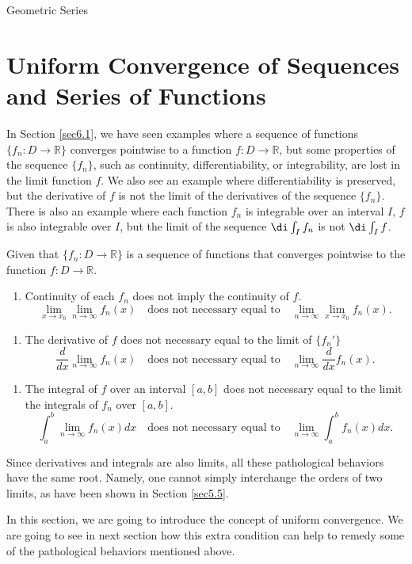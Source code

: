 \begin{example}[label=230305_16]{Geometric Series}
\vp

\section{Uniform Convergence of Sequences and Series of Functions}\label{sec6.2}
In Section \ref{sec6.1}, we have seen  examples where a sequence of functions $\{f_n:D\to\mathbb{R}\}$ converges pointwise to a function $f:D\to\mathbb{R}$, but some properties of the sequence $\{f_n\}$, such as continuity, differentiability, or integrability, are lost in the limit function $f$. We also see an example where differentiability is preserved, but the derivative of $f$ is not the limit of the derivatives of the sequence $\{f_n\}$. There is  also an example where each function $f_n$ is integrable over an interval $I$, $f$ is also integrable over $I$, but the limit of the sequence $\di\int_If_n$ is not $\di\int_If$. 

\begin{highlight}{}
Given that $\{f_n:D\to\mathbb{R}\}$ is a sequence of functions  that converges pointwise to the function $f:D\to\mathbb{R}$.
\begin{enumerate}[1.]
\item  Continuity of each $f_n$ does not imply the continuity of $f$.
\[\lim_{x\to x_0}\lim_{n\to\infty}f_n(x) \quad\text{does not necessary equal to}\quad 
\lim_{n\to\infty}\lim_{x\to x_0}f_n(x).\]\end{enumerate} 
\begin{enumerate}[2.]
\item The derivative of $f$ does not necessary equal to the limit of $\{f_n'\}$
\[\frac{d}{dx}\lim_{n\to\infty}f_n(x) \quad\text{does not necessary equal to}\quad \lim_{n\to\infty}\frac{d}{dx} f_n(x).\] \end{enumerate}\begin{enumerate}[3.]
\item  The integral of $f$ over an interval $[a,b]$ does not necessary equal to the limit the  integrals of $f_n$ over $[a,b]$.
\[\int_a^b\lim_{n\to\infty}f_n(x)dx\quad\text{does not necessary equal to}\quad\lim_{n\to\infty}\int_a^b f_n(x) dx .\]
\end{enumerate}
Since derivatives and integrals are also limits, all these pathological behaviors have the same root. Namely, one cannot simply interchange the orders of two limits, as have been shown in Section \ref{sec5.5}. 
\end{highlight}

In this section, we are going to introduce the concept of uniform convergence. We are going to see in next section  how this extra condition can help to remedy some of the pathological behaviors mentioned above.


\end{example}
